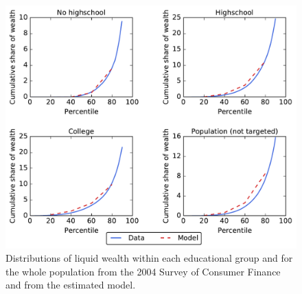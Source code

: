 \documentclass[../HAFiscal]{subfiles}
\begin{document}
\begin{figure}[th]
\begin{center}
	\includegraphics[width=.9\textwidth]{../Figures/LorenzPoints.pdf}
	\caption{Distributions of liquid wealth within each educational group and for the whole population from the 2004 Survey of Consumer Finance and from the estimated model.}
	\label{fig:LorenzPts}
\end{center}
\end{figure}
\end{document}
